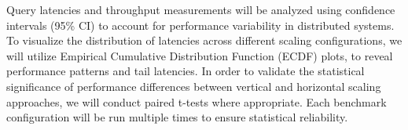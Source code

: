 \documentclass{article}
\begin{document}
Query latencies and throughput measurements will be analyzed using confidence
intervals (95\% CI) to account for performance variability in distributed
systems. 
%
To visualize the distribution of latencies across different scaling
configurations, we will utilize Empirical Cumulative Distribution Function
(ECDF) plots, to reveal performance patterns and tail latencies.
%
In order to validate the statistical significance of performance differences
between vertical and horizontal scaling approaches, we will conduct paired
t-tests where appropriate.
%
Each benchmark configuration will be run multiple times to ensure statistical
reliability.
\end{document}
